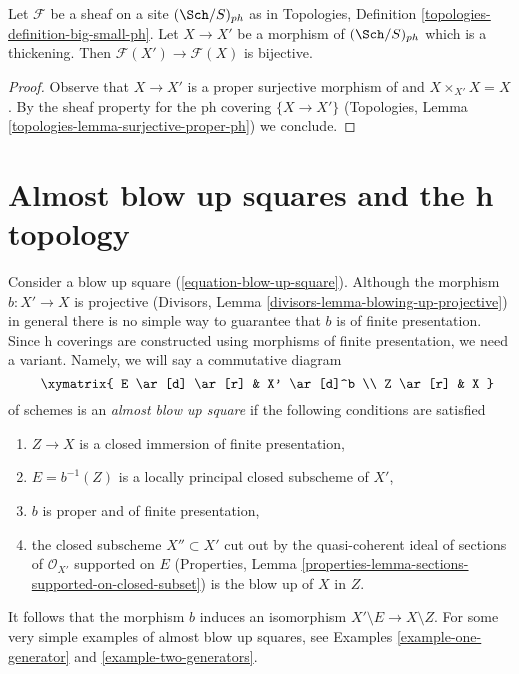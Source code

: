 \begin{lemma}
\label{lemma-thickening-ph}
Let $\mathcal{F}$ be a sheaf on a site $(\Sch/S)_{ph}$
as in Topologies, Definition \ref{topologies-definition-big-small-ph}.
Let $X \to X'$ be a morphism of $(\Sch/S)_{ph}$ which is
a thickening. Then
$\mathcal{F}(X') \to \mathcal{F}(X)$ is bijective.
\end{lemma}

\begin{proof}
Observe that $X \to X'$ is a proper surjective morphism of and
$X \times_{X'} X = X$.
By the sheaf property for the ph covering $\{X \to X'\}$
(Topologies, Lemma
\ref{topologies-lemma-surjective-proper-ph})
we conclude.
\end{proof}








\section{Almost blow up squares and the h topology}
\label{section-blow-up-h}

\noindent
Consider a blow up square (\ref{equation-blow-up-square}).
Although the morphism $b : X' \to X$
is projective (Divisors, Lemma \ref{divisors-lemma-blowing-up-projective})
in general there is no simple way to guarantee that
$b$ is of finite presentation. Since h coverings are constructed
using morphisms of finite presentation, we need a variant.
Namely, we will say a commutative diagram
\begin{equation}
\label{equation-almost-blow-up-square}
\vcenter{
\xymatrix{
E \ar[d] \ar[r] & X' \ar[d]^b \\
Z \ar[r] & X
}
}
\end{equation}
of schemes is an {\it almost blow up square} if the following conditions
are satisfied
\begin{enumerate}
\item $Z \to X$ is a closed immersion of finite presentation,
\item $E = b^{-1}(Z)$ is a locally principal closed subscheme of $X'$,
\item $b$ is proper and of finite presentation,
\item the closed subscheme $X'' \subset X'$ cut out by the quasi-coherent
ideal of sections of $\mathcal{O}_{X'}$ supported on $E$
(Properties, Lemma \ref{properties-lemma-sections-supported-on-closed-subset})
is the blow up of $X$ in $Z$.
\end{enumerate}
It follows that the morphism $b$ induces an isomorphism
$X' \setminus E \to X \setminus Z$.
For some very simple examples of almost blow up squares, see
Examples \ref{example-one-generator} and
\ref{example-two-generators}.

